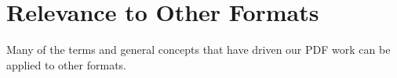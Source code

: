 \section{Relevance to Other Formats }
\label{sec:other-formats}

Many of the terms and general concepts that have driven our PDF work
can be applied to other formats. 



